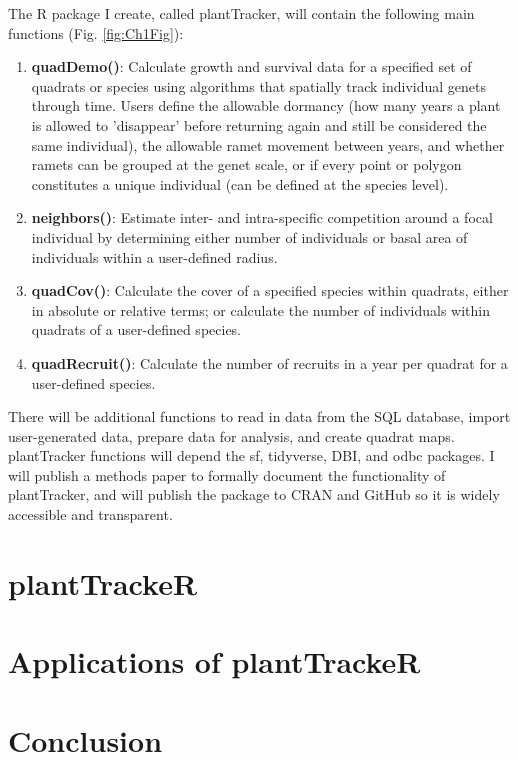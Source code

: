 \documentclass[12pt, letterpaper]{article}
\begin{document}
The \textsf{R} package I create, called plantTracker, will contain the following main functions (Fig. \ref{fig:Ch1Fig}):
\begin{enumerate}
    \item \textbf{quadDemo()}: Calculate growth and survival data for a specified set of quadrats or species using algorithms that spatially track individual genets through time. Users define the allowable dormancy (how many years a plant is allowed to 'disappear' before returning again and still be considered the same individual), the allowable ramet movement between years, and whether ramets can be grouped at the genet scale, or if every point or polygon constitutes a unique individual (can be defined at the species level).
    \item\textbf{neighbors()}: Estimate inter- and intra-specific competition around a focal individual by determining either number of individuals or basal area of individuals within a user-defined radius.
    \item\textbf{quadCov()}: Calculate the cover of a specified species within quadrats, either in absolute or relative terms; or calculate the number of individuals within quadrats of a user-defined species.
    \item\textbf{quadRecruit()}: Calculate the number of recruits in a year per quadrat for a user-defined species.
\end{enumerate}
There will be additional functions to read in data from the SQL database, import user-generated data, prepare data for analysis, and create quadrat maps. plantTracker functions will depend the sf, tidyverse, DBI, and odbc packages. I will publish a methods paper to formally document the functionality of plantTracker, and will publish the package to CRAN and GitHub so it is widely accessible and transparent.


\section{plantTrackeR}
\section{Applications of plantTrackeR}
\section{Conclusion}


\end{document}
